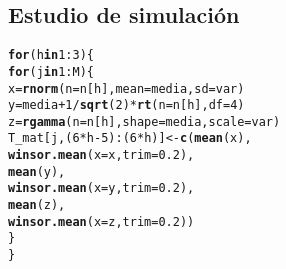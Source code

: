 \documentclass{article}\usepackage[]{graphicx}\usepackage[]{color}
\makeatletter
\newcommand{\hlnum}[1]{\textcolor[rgb]{0.686,0.059,0.569}{#1}}%
\newcommand{\hlopt}[1]{\textcolor[rgb]{0,0,0}{#1}}%
\newcommand{\hlstd}[1]{\textcolor[rgb]{0.345,0.345,0.345}{#1}}%
\newcommand{\hlkwa}[1]{\textcolor[rgb]{0.161,0.373,0.58}{\textbf{#1}}}%
\newcommand{\hlkwb}[1]{\textcolor[rgb]{0.69,0.353,0.396}{#1}}%
\newcommand{\hlkwc}[1]{\textcolor[rgb]{0.333,0.667,0.333}{#1}}%
\newcommand{\hlkwd}[1]{\textcolor[rgb]{0.737,0.353,0.396}{\textbf{#1}}}%
\newenvironment{kframe}{%
 \def\at@end@of@kframe{}%
 \ifinner\ifhmode%
  \def\at@end@of@kframe{\end{minipage}}%
  \begin{minipage}{\columnwidth}%
 \fi\fi%
 \def\FrameCommand##1{\hskip\@totalleftmargin \hskip-\fboxsep
 \colorbox{shadecolor}{##1}\hskip-\fboxsep
     \hskip-\linewidth \hskip-\@totalleftmargin \hskip\columnwidth}%
 \MakeFramed {\advance\hsize-\width
   \@totalleftmargin\z@ \linewidth\hsize
   \@setminipage}}%
 {\par\unskip\endMakeFramed%
 \at@end@of@kframe}
\newenvironment{knitrout}{}{} %
\makeatother
\begin{document}
\subsection*{Estudio de simulación}

\begin{knitrout}
\color{fgcolor}\begin{kframe}
\begin{alltt}
\hlkwa{for}\hlstd{(h} \hlkwa{in} \hlnum{1}\hlopt{:}\hlnum{3}\hlstd{)\{}
  \hlkwa{for}\hlstd{(j} \hlkwa{in} \hlnum{1}\hlopt{:}\hlstd{M)\{}
    \hlstd{x} \hlkwb{=} \hlkwd{rnorm}\hlstd{(}\hlkwc{n} \hlstd{= n[h],}\hlkwc{mean} \hlstd{= media,}\hlkwc{sd} \hlstd{= var)}
    \hlstd{y} \hlkwb{=} \hlstd{media} \hlopt{+} \hlnum{1}\hlopt{/}\hlkwd{sqrt}\hlstd{(}\hlnum{2}\hlstd{)}\hlopt{*}\hlkwd{rt}\hlstd{(}\hlkwc{n} \hlstd{= n[h],}\hlkwc{df} \hlstd{=} \hlnum{4}\hlstd{)}
    \hlstd{z} \hlkwb{=} \hlkwd{rgamma}\hlstd{(}\hlkwc{n} \hlstd{= n[h],}\hlkwc{shape} \hlstd{= media,} \hlkwc{scale} \hlstd{= var)}
    \hlstd{T_mat[j,(}\hlnum{6}\hlopt{*}\hlstd{h}\hlopt{-}\hlnum{5}\hlstd{)}\hlopt{:}\hlstd{(}\hlnum{6}\hlopt{*}\hlstd{h)]} \hlkwb{<-} \hlkwd{c}\hlstd{(}\hlkwd{mean}\hlstd{(x),}
                                \hlkwd{winsor.mean}\hlstd{(}\hlkwc{x} \hlstd{= x,}\hlkwc{trim} \hlstd{=} \hlnum{0.2}\hlstd{),}
                                \hlkwd{mean}\hlstd{(y),}
                                \hlkwd{winsor.mean}\hlstd{(}\hlkwc{x} \hlstd{= y,}\hlkwc{trim} \hlstd{=} \hlnum{0.2}\hlstd{),}
                                \hlkwd{mean}\hlstd{(z),}
                                \hlkwd{winsor.mean}\hlstd{(}\hlkwc{x} \hlstd{= z,}\hlkwc{trim} \hlstd{=} \hlnum{0.2}\hlstd{))}
  \hlstd{\}}
\hlstd{\}}
\end{alltt}
\end{kframe}
\end{knitrout}
\end{document}
